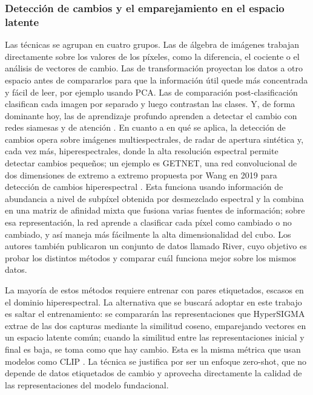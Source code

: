 \documentclass[12pt,onecolumn]{IEEEtran}
\begin{document}
\subsubsection{Detección de cambios y el emparejamiento en el espacio latente}
Las técnicas se agrupan en cuatro grupos. Las de álgebra de imágenes trabajan directamente sobre los valores de los píxeles, como la diferencia, el cociente o el análisis de vectores de cambio. Las de transformación proyectan los datos a otro espacio antes de compararlos para que la información útil quede más concentrada y fácil de leer, por ejemplo usando PCA. Las de comparación post-clasificación clasifican cada imagen por separado y luego contrastan las clases. Y, de forma dominante hoy, las de aprendizaje profundo aprenden a detectar el cambio con redes siamesas y de atención \cite{khelifi2020deep}. En cuanto a en qué se aplica, la detección de cambios opera sobre imágenes multiespectrales, de radar de apertura sintética y, cada vez más, hiperespectrales, donde la alta resolución espectral permite detectar cambios pequeños; un ejemplo es GETNET, una red convolucional de dos dimensiones de extremo a extremo propuesta por Wang en 2019 para detección de cambios hiperespectral \cite{wang2019getnet}. Esta funciona usando información de abundancia a nivel de subpíxel obtenida por desmezclado espectral y la combina en una matriz de afinidad mixta que fusiona varias fuentes de información; sobre esa representación, la red aprende a clasificar cada píxel como cambiado o no cambiado, y así maneja más fácilmente la alta dimensionalidad del cubo. Los autores también publicaron un conjunto de datos llamado River, cuyo objetivo es probar los distintos métodos y comparar cuál funciona mejor sobre los mismos datos.

La mayoría de estos métodos requiere entrenar con pares etiquetados, escasos en el dominio hiperespectral. La alternativa que se buscará adoptar en este trabajo es saltar el entrenamiento: se compararán las representaciones que HyperSIGMA extrae de las dos capturas mediante la similitud coseno, emparejando vectores en un espacio latente común; cuando la similitud entre las representaciones inicial y final es baja, se toma como que hay cambio. Esta es la misma métrica que usan modelos como CLIP \cite{radford2021clip}. La técnica se justifica por ser un enfoque zero-shot, que no depende de datos etiquetados de cambio y aprovecha directamente la calidad de las representaciones del modelo fundacional.
\end{document}
